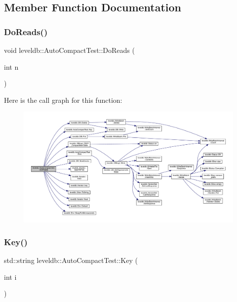 \subsection{Member Function Documentation}
\mbox{\label{classleveldb_1_1_auto_compact_test_a1d1feea1aef1257e461c35eb5b51fa52}} 
\subsubsection{\texorpdfstring{DoReads()}{DoReads()}}
{\footnotesize\ttfamily void leveldb\+::\+Auto\+Compact\+Test\+::\+Do\+Reads (\begin{DoxyParamCaption}\item[{int}]{n }\end{DoxyParamCaption})}

Here is the call graph for this function\+:
\nopagebreak
\begin{figure}[H]
\begin{center}
\leavevmode
\includegraphics[width=350pt]{classleveldb_1_1_auto_compact_test_a1d1feea1aef1257e461c35eb5b51fa52_cgraph}
\end{center}
\end{figure}
\mbox{\label{classleveldb_1_1_auto_compact_test_a02993bed0b92d580bb0a51b92191eba9}} 
\subsubsection{\texorpdfstring{Key()}{Key()}}
{\footnotesize\ttfamily std\+::string leveldb\+::\+Auto\+Compact\+Test\+::\+Key (\begin{DoxyParamCaption}\item[{int}]{i }\end{DoxyParamCaption})\hspace{0.3cm}{\ttfamily [inline]}}

